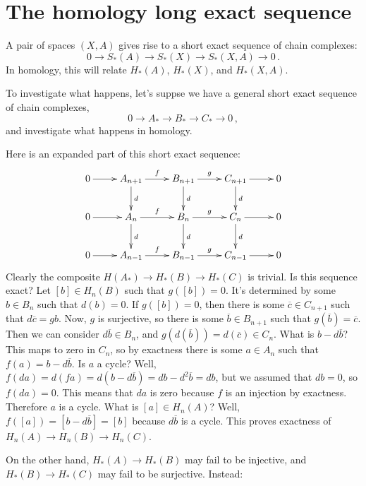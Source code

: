 \section{The homology long exact sequence}

A pair of spaces $(X,A)$ gives rise to a short exact sequence of chain 
complexes:
\[
0\to S_*(A)\to S_*(X)\to S_*(X,A)\to0\,.
\]
In homology, this will relate $H_*(A)$, $H_*(X)$, and $H_*(X,A)$. 

To investigate what happens, let's suppse we have a general short exact 
sequence of chain complexes,
\[
0\to A_*\to B_*\to C_*\to0\,,
\]
and investigate what happens in homology. 

Here is an expanded part of this short exact sequence:
\begin{equation*}
\xymatrix{0\ar[r] & A_{n+1}\ar[r]^f\ar[d]^d & B_{n+1}\ar[r]^g\ar[d]^d & C_{n+1}\ar[r]\ar[d]^d & 0\\
0\ar[r] & A_n\ar[r]^f\ar[d]^d & B_n\ar[r]^g\ar[d]^d & C_n\ar[r]\ar[d]^d & 0\\
0\ar[r] & A_{n-1}\ar[r]^f & B_{n-1}\ar[r]^g & C_{n-1}\ar[r] & 0}
\end{equation*}
Clearly the composite $H(A_*)\to H_*(B)\to H_*(C)$ is trivial. Is this sequence
exact?  
Let $[b]\in H_n(B)$ such that $g([b])=0$. It's determined by some $b\in B_n$ such that $d(b)=0$. If $g([b])=0$, then there is some $\overline{c}\in C_{n+1}$ such that $d\overline{c}=gb$. Now, $g$ is surjective, so there is some $\overline{b}\in B_{n+1}$ such that $g(\overline{b})=\overline{c}$. Then we can consider $d\overline{b}\in B_n$, and $g(d(\overline{b}))=d(\overline{c})\in C_n$. What is $b-d\overline{b}$? This maps to zero in $C_n$, so by exactness there is some $a\in A_n$ such that $f(a)=b-d\overline{b}$. Is $a$ a cycle? Well, $f(da)=d(fa)=d(b-d\overline{b})=db-d^2\overline{b}=db$, but we assumed that $db=0$, so $f(da)=0$. This means that $da$ is zero because $f$ is an injection by exactness. Therefore $a$ is a cycle. What is $[a]\in H_n(A)$? Well, $f([a])=[b-d\overline{b}]=[b]$ because $d\overline{b}$ is a cycle. This proves exactness of $ H_n(A)\to H_n(B)\to H_n(C)$.

On the other hand, $H_*(A)\to H_*(B)$ may fail to be injective, and 
$H_*(B)\to H_*(C)$ may fail to be surjective. Instead:

